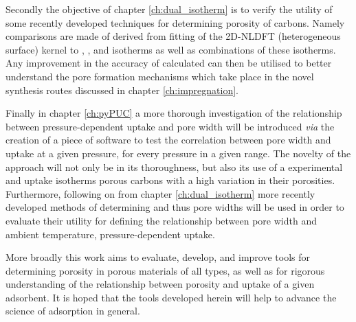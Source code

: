 Secondly the objective of chapter \ref{ch:dual_isotherm} is to verify the utility of some recently developed techniques for determining porosity of carbons. Namely comparisons are made of  derived from fitting of the 2D-NLDFT (heterogeneous surface) kernel to , , and  isotherms as well as combinations of these isotherms. Any improvement in the accuracy of calculated  can then be utilised to better understand the pore formation mechanisms which take place in the novel synthesis routes discussed in chapter \ref{ch:impregnation}. 

Finally in chapter \ref{ch:pyPUC} a more thorough investigation of the relationship between pressure-dependent  uptake and pore width will be introduced \textit{via} the creation of a piece of software to test the correlation between pore width and  uptake at a given pressure, for every pressure in a given range. The novelty of the approach will not only be in its thoroughness, but also its use of a experimental  and  uptake isotherms porous carbons with a high variation in their porosities. Furthermore, following on from chapter \ref{ch:dual_isotherm} more recently developed methods of determining  and thus pore widths will be used in order to evaluate their utility for defining the relationship between pore width and ambient temperature, pressure-dependent  uptake.

More broadly this work aims to evaluate, develop, and improve tools for determining porosity in porous materials of all types, as well as for rigorous understanding of the relationship between porosity and uptake of a given \gls{adsorbent}. It is hoped that the tools developed herein will help to advance the science of adsorption in general.